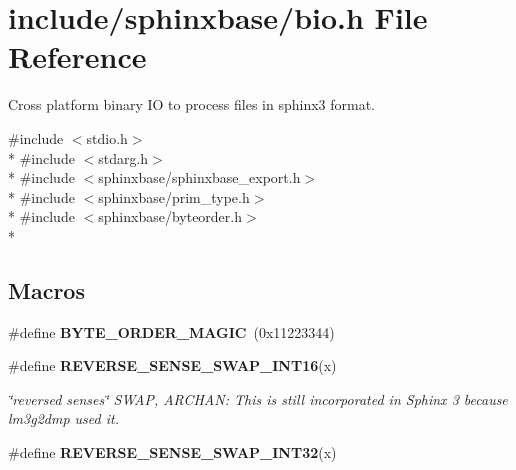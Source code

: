 \section{include/sphinxbase/bio.h File Reference}
\label{bio_8h}


Cross platform binary I\-O to process files in sphinx3 format.  


{\ttfamily \#include $<$stdio.\-h$>$}\\*
{\ttfamily \#include $<$stdarg.\-h$>$}\\*
{\ttfamily \#include $<$sphinxbase/sphinxbase\-\_\-export.\-h$>$}\\*
{\ttfamily \#include $<$sphinxbase/prim\-\_\-type.\-h$>$}\\*
{\ttfamily \#include $<$sphinxbase/byteorder.\-h$>$}\\*
\subsection*{Macros}
\begin{DoxyCompactItemize}
\item 
\#define {\bfseries B\-Y\-T\-E\-\_\-\-O\-R\-D\-E\-R\-\_\-\-M\-A\-G\-I\-C}~(0x11223344)\label{bio_8h_ac08e1e4728563a03ff6c937bfa8fd845}

\item 
\#define {\bf R\-E\-V\-E\-R\-S\-E\-\_\-\-S\-E\-N\-S\-E\-\_\-\-S\-W\-A\-P\-\_\-\-I\-N\-T16}(x)
\begin{DoxyCompactList}\small\item\em \char`\"{}reversed senses\char`\"{} S\-W\-A\-P, A\-R\-C\-H\-A\-N\-: This is still incorporated in Sphinx 3 because lm3g2dmp used it. \end{DoxyCompactList}\item 
\#define {\bfseries R\-E\-V\-E\-R\-S\-E\-\_\-\-S\-E\-N\-S\-E\-\_\-\-S\-W\-A\-P\-\_\-\-I\-N\-T32}(x)\label{bio_8h_a2c277e579a007b5c46bd762a7d18b2cf}

\end{DoxyCompactItemize}
